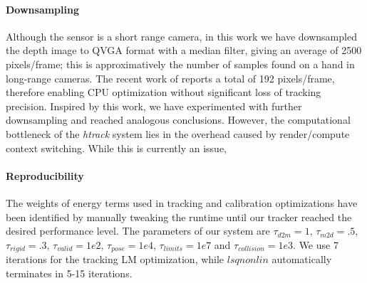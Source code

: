 \paragraph{Downsampling}
Although the \realsense{} sensor is a short range camera, in this work we have downsampled the depth image to QVGA format with a median filter, giving an average of 2500 pixels/frame; this is approximatively the number of samples found on a hand in long-range cameras. The recent work of \cite{taylor2016concerto} reports a total of 192 pixels/frame, therefore enabling CPU optimization without significant loss of tracking precision. Inspired by this work, we have experimented with further downsampling and reached analogous conclusions. However, the computational bottleneck of the \emph{htrack} system lies in the overhead caused by render/compute context switching. While this is currently an issue, 

\newpage
\paragraph{Reproducibility}
% 
The weights of energy terms used in tracking and calibration optimizations have been identified by manually tweaking the runtime until our tracker reached the desired performance level. 
The parameters of our system are $\tau_{d2m}=1$, $\tau_{m2d}=.5$, $\tau_{rigid}=.3$, $\tau_{valid}=1e2$, $\tau_{pose}=1e4$, $\tau_{limits}=1e7$ and $\tau_{collision}=1e3$. We use 7 iterations for the tracking LM optimization, while $lsqnonlin$ automatically terminates in 5-15 iterations. 

